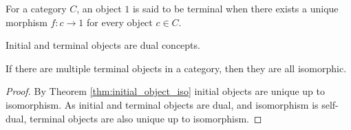 \begin{definition}
  For a category $C$, an object $1$ is said to be terminal when there exists a
  unique morphism $f: c\to 1$ for every object $c\in C$.
  \parencite{awodey:category_theory}
\end{definition}

\begin{remark}
  Initial and terminal objects are dual concepts.
\end{remark}

\begin{theorem}\label{thm:terminal_object_iso}
  If there are multiple terminal objects in a category, then they are all
  isomorphic.

  \begin{proof}
    By Theorem \ref{thm:initial_object_iso} initial objects are unique up to
    isomorphism. As initial and terminal objects are dual, and isomorphism is self-dual, terminal objects are also unique up to isomorphism.
  \end{proof}
\end{theorem}
